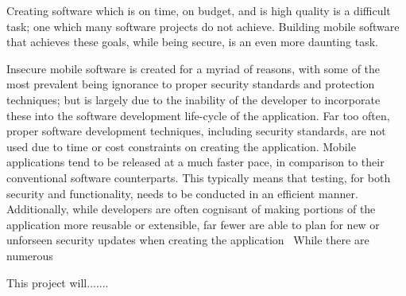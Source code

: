 



Creating software which is on time, on budget, and is high quality is a difficult task; one which many software projects do not achieve. Building mobile software that achieves these goals, while being secure, is an even more daunting task. 



Insecure mobile software is created for a myriad of reasons, with some of the most prevalent being ignorance to proper security standards and protection techniques; but is largely due to the inability of the developer to incorporate these into the software development life-cycle of the application. Far too often, proper software development techniques, including security standards, are not used due to time or cost constraints on creating the application. Mobile applications tend to be released at a much faster pace, in comparison to their conventional software counterparts. This typically means that testing, for both security and functionality, needs to be conducted in an efficient manner. Additionally, while developers are often cognisant of making portions of the application more reusable or extensible, far fewer are able to plan for new or unforseen security updates when creating the application~ While there are numerous 

This project will.......















